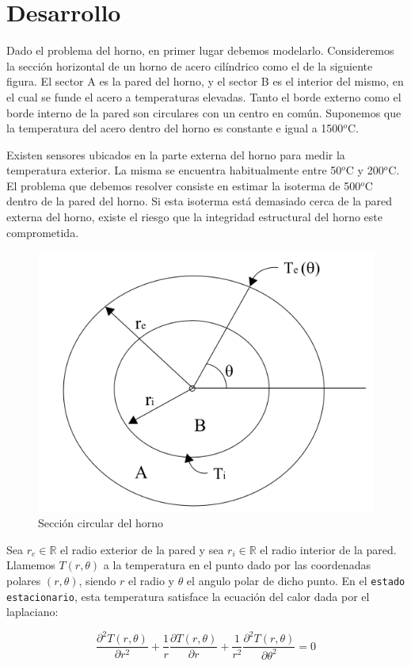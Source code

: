\section{Desarrollo}

Dado el problema del horno, en primer lugar debemos modelarlo. Consideremos la secci\'on horizontal de un horno de acero cil\'indrico como el de la siguiente figura. El sector A es la pared del horno, y el sector B es el interior del mismo, en el cual se funde el acero a temperaturas elevadas. Tanto el borde externo como el borde interno de la pared son circulares con un centro en común. Suponemos que la temperatura del acero dentro del horno es constante e igual a 1500$^{o}$C.

\medskip

Existen sensores ubicados en la parte externa del horno para medir la temperatura exterior. La misma se encuentra habitualmente entre 50$^{o}$C y 200$^{o}$C. El problema que debemos resolver consiste en estimar la isoterma de 500$^{o}$C dentro de la pared del horno. Si esta isoterma est\'a demasiado cerca de la pared externa del horno, existe el riesgo que la integridad estructural del horno este comprometida.

\begin{figure}[ht]
\begin{center}
\includegraphics[width=0.4\columnwidth]{catedra/Horno.png}
\caption{Secci\'on circular del horno}
\end{center}
\end{figure}

Sea $r_e \in \mathbb{R}$ el radio exterior de la pared y sea $r_i \in \mathbb{R}$ el radio interior de la pared. Llamemos $T(r,\theta)$ a la temperatura en el punto dado por las coordenadas polares $(r,\theta)$, siendo $r$ el radio y $\theta$ el angulo polar de dicho punto. En el \texttt{estado estacionario}, esta temperatura satisface la ecuación del calor dada por el laplaciano:

\begin{equation}\label{calor}
\frac{\partial^2T(r,\theta)}{\partial r^2}+\frac{1}{r}\frac{\partial T(r,\theta)}{\partial r}+\frac{1}{r^2}\frac{\partial^2T(r,\theta)}{\partial \theta^2} = 0 
\end{equation}

